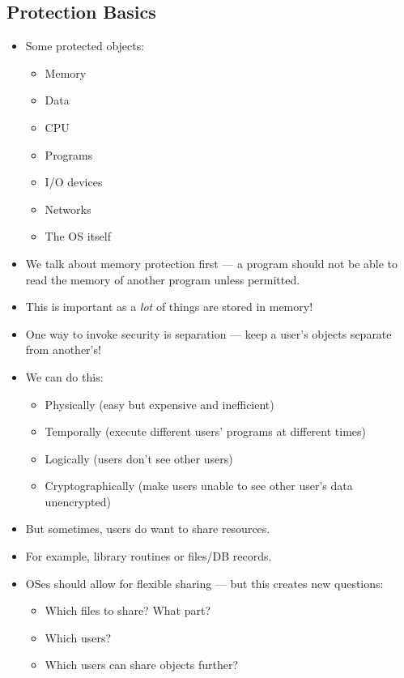 \documentclass{article}
\begin{document}
\subsection{Protection Basics}
\begin{itemize}
    \item Some protected objects:
        \begin{itemize}
            \item Memory
            \item Data
            \item CPU
            \item Programs
            \item I/O devices
            \item Networks
            \item The OS itself
        \end{itemize}
    \item We talk about memory protection first --- a program should not be able to read the memory of another program unless permitted.
    \item This is important as a \emph{lot} of things are stored in memory!
    \item One way to invoke security is separation --- keep a user's objects separate from another's!
    \item We can do this:
        \begin{itemize}
            \item Physically (easy but expensive and inefficient)
            \item Temporally (execute different users' programs at different times)
            \item Logically (users don't see other users)
            \item Cryptographically (make users unable to see other user's data unencrypted)
        \end{itemize}
    \item But sometimes, users do want to share resources.
    \item For example, library routines or files/DB records.
    \item OSes should allow for flexible sharing --- but this creates new questions:
        \begin{itemize}
            \item Which files to share?  What part?
            \item Which users?
            \item Which users can share objects further?

\end{itemize}
\end{itemize}
\end{document}

